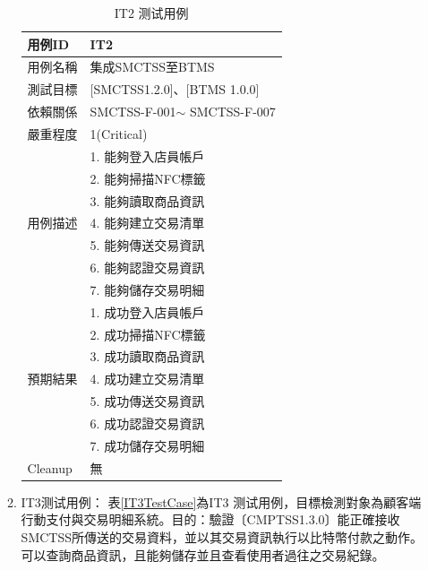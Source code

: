 \begin{enumerate}
\begin{enumerate}
						\begin{table}[!htbp]
						\caption{IT2 测试用例} %
						\centering %
						\label{IT2TestCase} %
						\begin{tabular}{|l|l|}
						\hline
						用例ID & IT2 \\ \hline
						用例名稱 & 集成SMCTSS至BTMS \\ \hline
						測試目標 & {[}SMCTSS1.2.0{]}、{[}BTMS 1.0.0{]} \\ \hline
						依賴關係 & SMCTSS-F-001$\sim$ SMCTSS-F-007 \\ \hline
						嚴重程度 & 1(Critical) \\ \hline
						\multirow{7}{*}{用例描述} & 1.     能夠登入店員帳戶 \\ \cline{2-2} 
						 & 2.     能夠掃描NFC標籤 \\ \cline{2-2} 
						 & 3.     能夠讀取商品資訊 \\ \cline{2-2} 
						 & 4.     能夠建立交易清單 \\ \cline{2-2} 
						 & 5.     能夠傳送交易資訊 \\ \cline{2-2} 
						 & 6.     能夠認證交易資訊 \\ \cline{2-2} 
						 & 7.     能夠儲存交易明細 \\ \hline
						\multirow{7}{*}{預期結果} & 1.     成功登入店員帳戶 \\ \cline{2-2} 
						 & 2.     成功掃描NFC標籤 \\ \cline{2-2} 
						 & 3.     成功讀取商品資訊 \\ \cline{2-2} 
						 & 4.     成功建立交易清單 \\ \cline{2-2} 
						 & 5.     成功傳送交易資訊 \\ \cline{2-2} 
						 & 6.     成功認證交易資訊 \\ \cline{2-2} 
						 & 7.     成功儲存交易明細 \\ \hline
						Cleanup & 無 \\ \hline
						\end{tabular}
						\end{table}

				\item IT3测试用例：
					表\ref{IT3TestCase}為IT3 测试用例，目標檢測對象為顧客端行動支付與交易明細系統。目的：驗證〔CMPTSS1.3.0〕能正確接收SMCTSS所傳送的交易資料，並以其交易資訊執行以比特幣付款之動作。可以查詢商品資訊，且能夠儲存並且查看使用者過往之交易紀錄。


\end{enumerate}
\end{enumerate}
